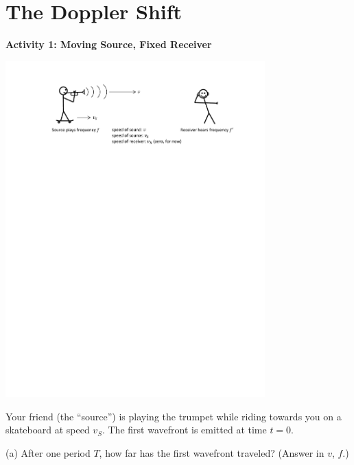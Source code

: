 \section{The Doppler Shift}

\makelabheader %

\vspace{0.1in}
%


\textbf{Activity 1: Moving Source, Fixed Receiver}

\begin{center}
\includegraphics[width=0.75\textwidth]{doppler_shift/moving_source.pdf}
\end{center}

Your friend (the ``source'') is playing the trumpet while riding towards you on a skateboard at speed $v_S$.  The first wavefront is emitted at time $t=0$.

(a) After one period $T$, how far has the first wavefront traveled?  (Answer in $v$, $f$.)
\vspace{1.0in}

